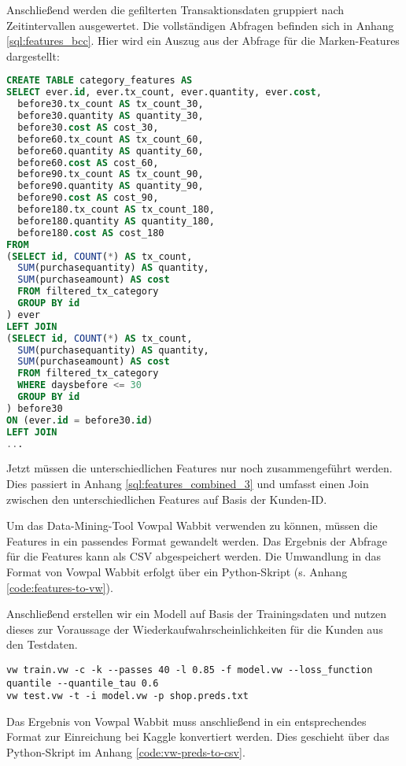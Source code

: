 Anschließend werden die gefilterten Transaktionsdaten gruppiert nach
Zeitintervallen ausgewertet. Die vollständigen Abfragen befinden sich
in Anhang \ref{sql:features_bcc}. Hier wird ein Auszug aus der
Abfrage für die Marken-Features dargestellt:

\newpage

\begin{lstlisting}[language=SQL]
CREATE TABLE category_features AS
SELECT ever.id, ever.tx_count, ever.quantity, ever.cost,
  before30.tx_count AS tx_count_30,
  before30.quantity AS quantity_30,
  before30.cost AS cost_30,
  before60.tx_count AS tx_count_60,
  before60.quantity AS quantity_60,
  before60.cost AS cost_60,
  before90.tx_count AS tx_count_90,
  before90.quantity AS quantity_90,
  before90.cost AS cost_90,
  before180.tx_count AS tx_count_180,
  before180.quantity AS quantity_180,
  before180.cost AS cost_180
FROM 
(SELECT id, COUNT(*) AS tx_count, 
  SUM(purchasequantity) AS quantity, 
  SUM(purchaseamount) AS cost
  FROM filtered_tx_category
  GROUP BY id
) ever
LEFT JOIN
(SELECT id, COUNT(*) AS tx_count, 
  SUM(purchasequantity) AS quantity, 
  SUM(purchaseamount) AS cost
  FROM filtered_tx_category
  WHERE daysbefore <= 30
  GROUP BY id
) before30
ON (ever.id = before30.id)
LEFT JOIN
...
\end{lstlisting}

Jetzt müssen die unterschiedlichen Features nur noch zusammengeführt werden. Dies passiert
in Anhang \ref{sql:features_combined_3} und umfasst einen Join zwischen den
unterschiedlichen Features auf Basis der Kunden-ID.

Um das Data-Mining-Tool Vowpal Wabbit verwenden zu können, müssen die Features in ein
passendes Format gewandelt werden. Das Ergebnis der Abfrage für die Features kann
als CSV abgespeichert werden. Die Umwandlung in das Format von Vowpal Wabbit
erfolgt über ein Python-Skript (s. Anhang \ref{code:features-to-vw}).

Anschließend erstellen wir ein Modell auf Basis der Trainingsdaten und nutzen dieses
zur Voraussage der Wiederkaufwahrscheinlichkeiten für die Kunden aus den Testdaten.
\begin{lstlisting}
vw train.vw -c -k --passes 40 -l 0.85 -f model.vw --loss_function quantile --quantile_tau 0.6
vw test.vw -t -i model.vw -p shop.preds.txt
\end{lstlisting}

Das Ergebnis von Vowpal Wabbit muss anschließend in ein entsprechendes Format zur Einreichung bei 
Kaggle konvertiert werden. Dies geschieht über das Python-Skript im Anhang 
\ref{code:vw-preds-to-csv}. 

